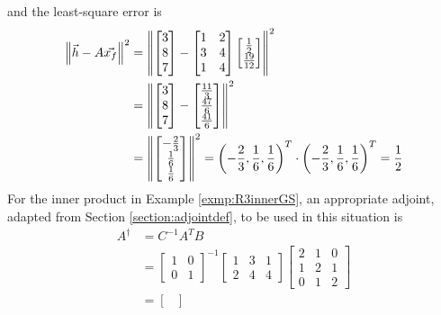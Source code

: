 \begin{solution}
and the least-square error is
\begin{align*}
\norm{\vec{h}-A\vec{x_f}}^2 &=
\norm{\begin{bmatrix}
3 \\
8 \\
7
\end{bmatrix}-
\begin{bmatrix}
1 & 2 \\
3 & 4 \\
1 & 4
\end{bmatrix}
\begin{bmatrix}
\frac{1}{2} \\
\frac{19}{12}
\end{bmatrix}
}^2 \\
&= 
\norm{\begin{bmatrix}
3 \\
8 \\
7
\end{bmatrix}-
\begin{bmatrix}
\frac{11}{3}\\
\frac{47}{6}\\ 
\frac{41}{6}
\end{bmatrix}
}^2 \\
&= 
\norm{\begin{bmatrix}-\frac{2}{3}\\ 
\frac{1}{6}\\ 
\frac{1}{6}\end{bmatrix}}^2 = \left(-\frac{2}{3}, \frac{1}{6}, \frac{1}{6}\right)^T \cdot \left(-\frac{2}{3}, \frac{1}{6}, \frac{1}{6}\right)^T = \frac{1}{2}
\end{align*}
For the inner product in Example \ref{exmp:R3innerGS}, an appropriate adjoint, adapted from Section \ref{section:adjointdef}, to be used in this situation is
\begin{align*}
A^\dag &= C^{-1} A^T B \\
&=
\begin{bmatrix}
1 & 0 \\
0 & 1
\end{bmatrix}^{-1}
\begin{bmatrix}
1 & 3 & 1\\
2 & 4 & 4
\end{bmatrix}
\begin{bmatrix}
2&1&0\\ 
1&2&1\\
0&1&2
\end{bmatrix} \\
&=
\begin{bmatrix}

\end{bmatrix}
\end{align*}
\end{solution}
